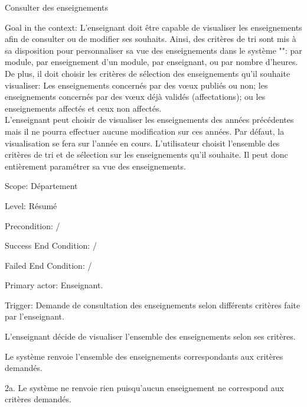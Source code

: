 \begin{ocl}
\begin{usecase}{Consulter des enseignements}
\begin{information}
	\item[Goal in the context:]  L'enseignant doit être capable de visualiser les enseignements afin de consulter ou de modifier ses souhaits.
 Ainsi, des critères de tri sont mis à sa disposition pour personnaliser sa vue des enseignements dans le système "\projet": par module, par enseignement d'un module, par enseignant, ou par nombre d'heures.\\
 De plus, il doit choisir les critères de sélection des enseignements qu'il souhaite visualiser:
Les enseignements concernés par des v\oe ux publiés ou non; les enseignements concernés par des v\oe ux déjà validés (affectations);
ou les enseignements affectés et ceux non affectés.\\
 L'enseignant peut choisir de visualiser les enseignements des années précédentes mais il ne pourra effectuer aucune modification sur ces années. Par défaut, la visualisation se fera sur l'année en cours.
 L'utilisateur choisit l'ensemble des critères de tri et de sélection sur les enseignements qu'il souhaite. Il peut donc entièrement paramétrer sa vue des enseignements.
	\item[Scope:] Département
	\item[Level:] Résumé
	\item[Precondition:]/
	\item[Success End Condition:]/
	\item[Failed End Condition:]/
	\item[Primary actor:] Enseignant.
	\item[Trigger:] Demande de consultation des enseignements selon différents critères faite par l'enseignant.
\end{information}

\begin{scenario}
	\item L'enseignant décide de visualiser l'ensemble des enseignements selon ses critères.
	\item Le système renvoie l'ensemble des enseignements correspondants aux critères demandés.
\end{scenario}

 \begin{extension}
 \item [2a.] Le système ne renvoie rien puisqu'aucun enseignement ne correspond aux critères demandés.
 \end{extension}
\end{usecase}



\end{ocl}
